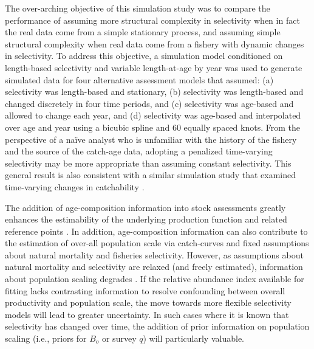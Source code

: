 \documentclass[review,letterpaper,10pt,authoryear]{elsarticle}
\begin{document}
The over-arching objective of this simulation study was to compare the performance of assuming more structural complexity in selectivity when in fact the real data come from a simple stationary process, and assuming simple structural complexity when real data come from a fishery with dynamic changes in selectivity.  To address this objective, a simulation model conditioned on length-based selectivity and variable length-at-age by year was used to generate simulated data for four alternative assessment models that assumed: (a) selectivity was length-based and stationary, (b) selectivity was length-based and changed discretely in four time periods, and (c) selectivity was age-based and allowed to change each year, and (d) selectivity was age-based and interpolated over age and year using a bicubic spline and 60 equally spaced knots.  From the perspective of a na\"ive analyst who is unfamiliar with the history of the fishery and the source of the catch-age data, adopting a penalized time-varying selectivity may be more appropriate than assuming constant selectivity.  This general result is also consistent with a similar simulation study that examined time-varying changes in catchability \citep{wilberg2006performance}.

The addition of age-composition information into stock assessments greatly enhances the estimability of the underlying production function and related reference points \citep{magnusson2007mfd}.  In addition, age-composition information can also contribute to the estimation of over-all population scale via catch-curves and fixed assumptions about natural mortality and fisheries selectivity.  However, as assumptions about natural mortality and selectivity are relaxed (and freely estimated), information about population scaling degrades \citep{hilborn1992quantitative}. If the relative abundance index available for fitting lacks contrasting information to resolve confounding between overall productivity and population scale, the move towards more flexible selectivity models will lead to greater uncertainty.  In such cases where it is known that selectivity has changed over time, the addition of prior information on population scaling (i.e., priors for $B_o$ or survey $q$) will particularly valuable. 
\end{document}
